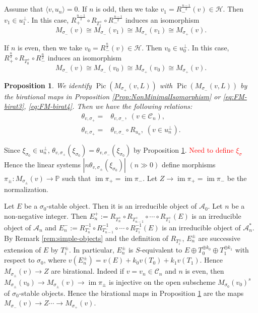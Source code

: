 \documentclass[leqno,11pt]{amsart}
\def\P{\ensuremath{\mathbb{P}}}
\def\im{\mathop{\mathrm{im}}\nolimits}
\def\Pic{\mathop{\mathrm{Pic}}\nolimits}
\newtheorem{Prop}[Thm]{Proposition}
\theoremstyle{definition}
\def\P{\ensuremath{\mathbb{P}}}
\def\AA{\ensuremath{\mathcal A}}
\def\CC{\ensuremath{\mathcal C}}
\def\HH{\ensuremath{\mathcal H}}
\begin{document}
Assume that $\langle v, u_n \rangle=0$.
If $n$ is odd, then 
we  take $v_1 =R_-^{\frac{n-1}{2}}(v) \in \HH$.
Then $v_1 \in u_1^\perp$.
In this case, 
$R_+^{\frac{n-1}{2}} \circ R_{T_1^+}
\circ R_-^{\frac{n-1}{2}}$ induces
an isomorphism
\begin{equation}\label{eq:FM-birat3}
M_{\sigma_-}(v) \cong M_{\sigma_-}(v_1) \cong M_{\sigma_+}(v_1) 
\cong M_{\sigma_+}(v).
\end{equation}

If $n$ is even, then we take $v_0=R_-^{\frac{n}{2}}(v) \in \HH$.
Then $v_0 \in u_0^\perp$.
In this case, 
$R_+^{\frac{n}{2}} \circ R_{T_0^+}
\circ R_-^{\frac{n}{2}}$ induces
an isomorphism
\begin{equation}\label{eq:FM-birat4}
M_{\sigma_-}(v) \cong M_{\sigma_-}(v_0) \cong M_{\sigma_+}(v_0) 
\cong M_{\sigma_+}(v).
\end{equation}


\begin{Prop}\label{Prop:Pic-relation}
We identify $\Pic(M_{\sigma_+}(v,L))$ with 
$\Pic(M_{\sigma_-}(v,L))$
by the birational maps in Proposition \ref{Prop:NonMinimalIsomorphism} 
or \eqref{eq:FM-birat3}, \eqref{eq:FM-birat4}.
Then we have the following relations:
\begin{equation}
\begin{split}
\theta_{v,\sigma_+}=& \theta_{v,\sigma_-},\; (v \in \CC_n),\\
\theta_{v,\sigma_+}=& \theta_{v,\sigma_-} \circ R_{u_n} ,\; (v \in u_n^\perp).
\end{split}
\end{equation}
\end{Prop}


Since $\xi_{\sigma_0} \in u_n^\perp$,
$\theta_{v,\sigma_+}(\xi_{\sigma_0})=
\theta_{v,\sigma_-}(\xi_{\sigma_0})$
by Proposition \ref{Prop:Pic-relation}.
\textcolor{red}{Need to define $\xi_\sigma$}
Hence the linear systems
$|n \theta_{v,\sigma_\pm}(\xi_{\sigma_0})|$ $(n \gg 0)$
define morphisms $\pi_\pm:M_{\sigma_{\pm}}(v) \to \P$
such that $\im \pi_+=\im \pi_-$.
Let $Z \to \im \pi_+=\im \pi_-$ be the normalization.
 
Let $E$ be a $\sigma_0$-stable object. Then
it is an irreducible object of $\AA_0$.
Let $n$ be a non-negative integer.
Then $E_n^+:=R_{T_n^+} \circ R_{T_{n-1}^+} \circ  \cdots \circ R_{T_1^+}(E)$
is an irreducible object of $\AA_n$
and $E_n^-:=R_{T_n^-}^{-1} \circ 
R_{T_{n-1}^-}^{-1} \circ  \cdots \circ R_{T_1^-}^{-1}(E)$
is an irreducible object of $\AA_n^*$.
By Remark \ref{rem:simple-objects} and 
the definition of $R_{T_i^\pm}$,
$E_n^\pm$ are successive extension of $E$ by $T_i^\pm$.
In particular, $E_n^\pm$ is $S$-equivalent to 
$E \oplus T_0^{\oplus k_0} \oplus T_1^{\oplus k_1}$
with respect to $\sigma_0$, where 
$v(E_n^\pm)=v(E)+k_0 v(T_0)+k_1 v(T_1)$. 
Hence $M_{\sigma_\pm}(v) \to Z$ are 
birational. Indeed if $v=v_n \in \CC_n$ and $n$ is even, then
$M_{\sigma_\pm}(v_0) \to M_{\sigma_\pm}(v) \to \im \pi_\pm$
is injective on the open subscheme $M_{\sigma_0}(v_0)^s$
of $\sigma_0$-stable objects.  
Hence the birational maps in Proposition \ref{Prop:Pic-relation}
are the maps
$M_{\sigma_-}(v) \to Z \cdots \to M_{\sigma_+}(v)$.
\end{document}

